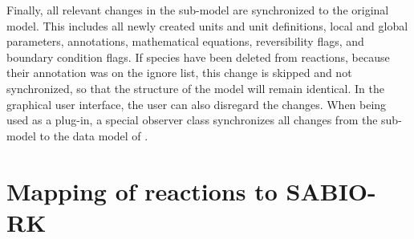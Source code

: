 Finally, all relevant changes in the sub-model are synchronized to the original model.
This includes all newly created units and unit definitions, local and global parameters, annotations, mathematical equations, reversibility flags, and boundary condition flags.
If species have been deleted from reactions, because their \MIRIAM annotation was on the ignore list, this change is skipped and not synchronized, so that the structure of the model will remain identical.
In the graphical user interface, the user can also disregard the changes.
When being used as a \CellDesigner plug-in, a special observer class synchronizes all changes from the sub-model to the data model of \CellDesigner.

\section{Mapping of reactions to SABIO-RK}

